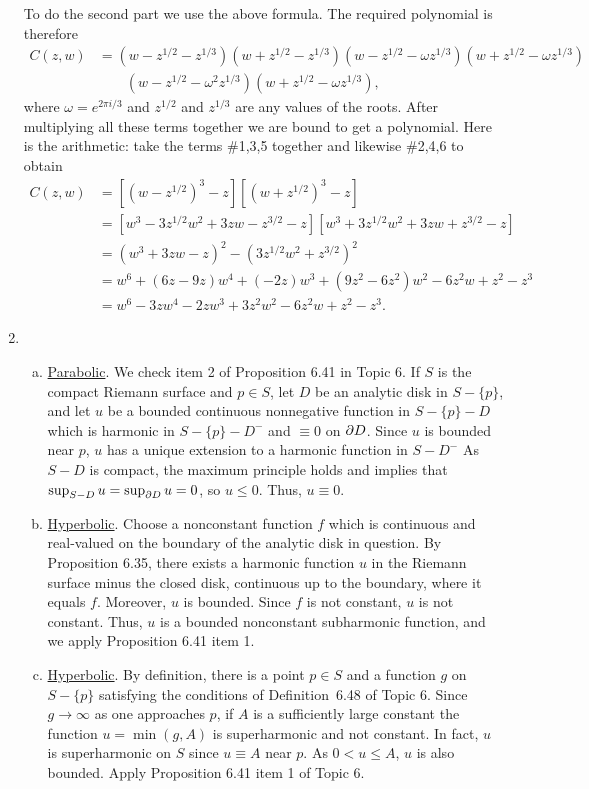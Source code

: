 \documentclass[a4paper,11pt]{article}
\begin{document}
\begin{enumerate}
  To do the second part we use the above formula.  The required
  polynomial is therefore
  $$
  \begin{aligned}
    C(z,w) &= (w-z^{1/2}-z^{1/3})(w+z^{1/2}-z^{1/3})(w-z^{1/2}-\omega
    z^{1/3}) (w+z^{1/2}-\omega z^{1/3})\\
    &\qquad (w-z^{1/2}-\omega^2 z^{1/3}) (w+z^{1/2}-\omega z^{1/3}),
  \end{aligned}
  $$
  where $\omega = e^{2\pi i/3}$ and $z^{1/2}$ and $z^{1/3}$ are any
  values of the roots.  After multiplying all these terms together we
  are bound to get a polynomial.  Here is the arithmetic: take the
  terms \#1,3,5 together and likewise \#2,4,6 to obtain
  $$
  \begin{aligned}
    C(z,w) &= [(w-z^{1/2})^3 - z][(w+z^{1/2})^3 - z]\\
    &= [w^3 - 3z^{1/2} w^2 + 3zw - z^{3/2} - z]
    [w^3 + 3z^{1/2} w^2 + 3zw + z^{3/2} - z]\\
    &= (w^3 + 3zw - z)^2 - (3z^{1/2} w^2 + z^{3/2})^2\\
    &= w^6 + (6z-9z)w^4 + (-2z) w^3 + (9z^2-6z^2)w^2
    - 6z^2 w + z^2 - z^3\\
    &= w^6 - 3zw^4 - 2zw^3 + 3z^2 w^2 - 6z^2 w + z^2 - z^3.
  \end{aligned}
  $$
\item 
  \begin{enumerate}[a)]
  \item \underline{Parabolic}.  We check item 2 of Proposition 6.41 in
    Topic 6.  If $S$ is the compact Riemann surface and $p \in S$, let
    $D$ be an analytic disk in $S - \{p\}$, and let $u$ be a bounded
    continuous nonnegative function in $S - \{p\} -D$ which is
    harmonic in $S - \{p\} - D^-$ and $\equiv 0$ on $\partial D$.  Since $u$
    is bounded near $p$, $u$ has a unique extension to a harmonic
    function in $S - D^-$  As $S - D$ is compact, the maximum
    principle holds and implies that $\sup_{S-D} u = \sup_{\partial D} u =
    0$, so $u \le 0$.  Thus, $u \equiv 0$.
  \item \underline{Hyperbolic}.  Choose a nonconstant function $f$
    which is continuous and real-valued on the boundary of the
    analytic disk in question.  By Proposition 6.35, there exists a
    harmonic function $u$ in the Riemann surface minus the closed
    disk, continuous up to the boundary, where it equals $f$.
    Moreover, $u$ is bounded.  Since $f$ is not constant, $u$ is not
    constant.  Thus, $u$ is a bounded nonconstant subharmonic
    function, and we apply Proposition 6.41 item 1.
  \item \underline{Hyperbolic}.  By definition, there is a point $p
    \in S$ and a function $g$ on $S - \{p\}$ satisfying the conditions
    of Definition~6.48 of Topic 6.  Since 
    $g \to \infty$ as one approaches $p$, if $A$ is a sufficiently
    large constant the function $u = \min(g,A)$ is superharmonic and
    not constant.  In fact, $u$ is superharmonic on $S$ since $u
    \equiv A$ near $p$.  As $0 < u \le A$, $u$ is also bounded.  Apply
    Proposition 6.41 item 1 of Topic 6.
  \end{enumerate}
\end{enumerate}
\end{document}
